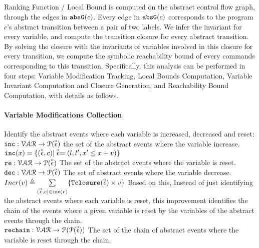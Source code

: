 \subsection{}
\label{sec:pathsensitive_rb-lbcompute}
Ranking Function / Local Bound is computed on the abstract control flow graph, 
through the edges in $\mathtt{abs}{\mathtt{G}}(c)$.
Every edge in $\mathtt{abs}{\mathtt{G}}(c)$ corresponds to the program $c$'s abstract transition between a pair of two labels.
We infer the invariant for every variable, and compute the transition closure for every abstract transition. By solving the closure
with the invariants of variables involved in this closure for every transition, we compute
the symbolic reachability bound of every commands corresponding to this transition. Specifically, this analysis can be performed in four steps:
 Variable Modification Tracking, Local Bounds Computation,
Variable Invariant Computation and Closure Generation, and Reachability Bound Computation,
% 
with details as follows.
%
%
\paragraph*{Variable Modifications Collection}
Identify the abstract events where each variable is increased, decreased and reset:
\\
$\mathtt{inc}: \mathcal{VAR} \to \mathcal{P}(\stackrel{\scriptscriptstyle{\alpha}}{\mathtt{\epsilon}{}}) $
the set of the abstract events where the variable increase.
\\
$\mathtt{inc}(x) = \{(\stackrel{\scriptscriptstyle{\alpha}}{\mathtt{\epsilon}{}}, c) | \stackrel{\scriptscriptstyle{\alpha}}{\mathtt{\epsilon}{}} = (l, l', x' \leq x + v)\}$
\\
$\mathtt{re}: \mathcal{VAR} \to \mathcal{P}(\stackrel{\scriptscriptstyle{\alpha}}{\mathtt{\epsilon}{}}) $
The set of the abstract events where the variable is reset.
\\
$\mathtt{dec}: \mathcal{VAR} \to \mathcal{P}(\stackrel{\scriptscriptstyle{\alpha}}{\mathtt{\epsilon}{}}) $
The set of abstract events where the variable decrease.
\\
$Incr(v) \triangleq \sum\limits_{(\stackrel{\scriptscriptstyle{\alpha}}{\mathtt{\epsilon}{}}, c) \in \mathtt{inc}(v)}\{{\mathtt{Tclosure}}(\stackrel{\scriptscriptstyle{\alpha}}{\mathtt{\epsilon}{}}) \times v\}$
%
Based on this, 
Instead of just identifying the abstract events where each variable is reset,
this improvement identifies the chain of the events where a given variable is reset by the 
variables of the abstract events through the chain.
\\
$\mathtt{rechain}: \mathcal{VAR} \to \mathcal{P}(\mathcal{P}(\stackrel{\scriptscriptstyle{\alpha}}{\mathtt{\epsilon}{}})) $
The set of the chain of abstract events where the variable is reset through the chain.
%
